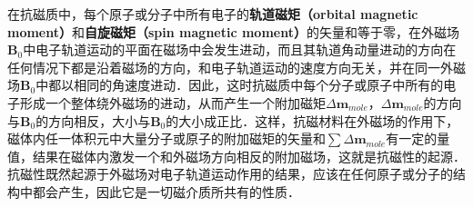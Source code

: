 
\begin{issues}
\issueDraft
{}
\end{issues}

在抗磁质中，每个原子或分子中所有电子的\textbf{轨道磁矩（orbital magnetic moment）}和\textbf{自旋磁矩（spin magnetic moment）}的矢量和等于零，在外磁场$\mathbf B_0$中电子轨道运动的平面在磁场中会发生进动，而且其轨道角动量进动的方向在任何情况下都是沿着磁场的方向，和电子轨道运动的速度方向无关，并在同一外磁场$\mathbf B_0$中都以相同的角速度进动．因此，这时抗磁质中每个分子或原子中所有的电子形成一个整体绕外磁场的进动，从而产生一个附加磁矩$\Delta\mathbf{m}_{mole}$，$\Delta\mathbf{m}_{mole}$的方向与$\mathbf B_0$的方向相反，大小与$\mathbf B_0$的大小成正比．这样，抗磁材料在外磁场的作用下，磁体内任一体积元中大量分子或原子的附加磁矩的矢量和$\sum \Delta\mathbf{m}_{mole}$有一定的量值，结果在磁体内激发一个和外磁场方向相反的附加磁场，这就是抗磁性的起源．抗磁性既然起源于外磁场对电子轨道运动作用的结果，应该在任何原子或分子的结构中都会产生，因此它是一切磁介质所共有的性质．
